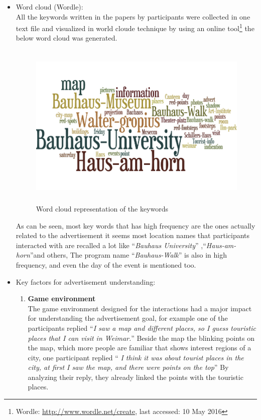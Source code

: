 \begin{itemize}
\begin{enumerate}
\end{enumerate}

\item Word cloud (Wordle): \\
All the keywords written in the papers by participants were collected in one text file and visualized in world cloude technique by using an online tool\footnote{Wordle: \url{http://www.wordle.net/create}, last accessed: 10 May 2016} the below word cloud was generated.

\begin{figure}[H]
\centering
\includegraphics[width=12cm,height=8cm]{Figures/6/wordle}%
 \caption{Word cloud representation of the keywords}%
 \label{fig:wordle}%
\end{figure}

As can be seen, most key words that has high frequency are the ones actually related to the advertisement it seems most location names that participants interacted with are recalled a lot like ``\emph{Bauhaus University}'' ,``\emph{Haus-am-horn}''and others, The program name ``\emph{Bauhaus-Walk}'' is also in high frequency, and even the day of the event is mentioned too.


\item Key factors for advertisement understanding: \\
\begin{enumerate}
\item	\textbf{Game environment} \\
The game environment designed for the interactions had a major impact for understanding the advertisement goal, for example one of the participants replied ``\emph{I saw a map and different places, so I guess touristic places that I can visit in Weimar.}'' Beside the map the blinking points on the map, which more people are familiar that shows interest regions of a city, one participant replied ``\emph{ I think it was about tourist places in the city, at first I saw the map, and there were points on the top}'' By analyzing their reply, they already linked the points with the touristic places.


\end{enumerate}
\end{itemize}

